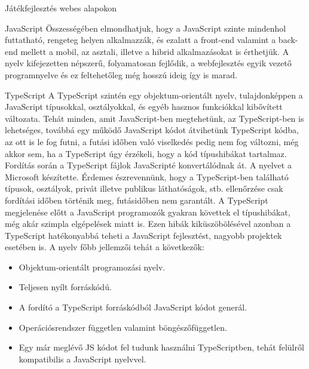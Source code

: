 \begin{MyChapter}{Játékfejlesztés webes alapokon}
\begin{MySection}{JavaScript}
		Összességében elmondhatjuk, hogy a JavaScript szinte mindenhol futtatható, rengeteg helyen alkalmazzák, és ezalatt a front-end valamint a back-end mellett a mobil, az asztali, illetve a hibrid alkalmazásokat is érthetjük. A nyelv kifejezetten népszerű, folyamatosan fejlődik, a webfejlesztés egyik vezető programnyelve és ez feltehetőleg még hosszú ideig így is marad.
	\end{MySection}

	\begin{MySection}{TypeScript}
		A TypeScript szintén egy objektum-orientált nyelv, tulajdonképpen a JavaScript típusokkal, osztályokkal, és egyéb hasznos funkciókkal kibővített változata. Tehát minden, amit JavaScript-ben megtehetünk, az TypeScript-ben is lehetséges, továbbá egy működő JavaScript kódot átvihetünk TypeScript kódba, az ott is le fog futni, a futási időben való viselkedés pedig nem fog változni, még akkor sem, ha a TypeScript úgy érzékeli, hogy a kód típushibákat tartalmaz. Fordítás során a TypeScript fájlok JavaScripté konvertálódnak át. A nyelvet a Microsoft készítette. Érdemes észrevennünk, hogy a TypeScript-ben található típusok, osztályok, privát illetve publikus láthatóságok, stb. ellenőrzése csak fordítási időben történik meg, futásidőben nem garantált.
		A TypeScript megjelenése előtt a JavaScript programozók gyakran követtek el típushibákat, még akár szimpla elgépelések miatt is. Ezen hibák kiküszöbölésével azonban a TypeScript hatékonyabbá teheti a JavaScript fejlesztést, nagyobb projektek esetében is.
		\newline \newline
		A nyelv főbb jellemzői tehát a következők:
		\begin{itemize}
			\item Objektum-orientált programozási nyelv.
			\item Teljesen nyílt forráskódú.
			\item A fordító a TypeScript forráskódból JavaScript kódot generál.
			\item Operációsrendszer független valamint böngészőfüggetlen.
			\item Egy már meglévő JS kódot fel tudunk használni TypeScriptben, tehát felülről kompatibilis a JavaScript nyelvvel.
		\end{itemize}
	\end{MySection}


\end{MyChapter}
